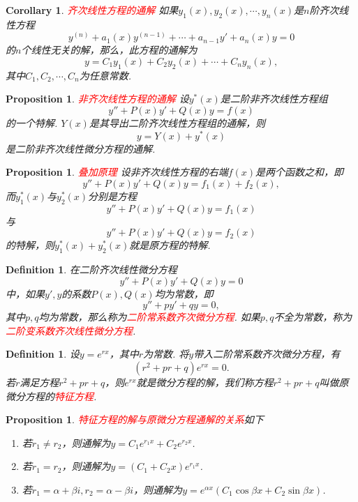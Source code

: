 \documentclass{article}
\newtheorem{corollary}[theorem]{Corollary}
\newtheorem{proposition}[theorem]{Proposition}
\newtheorem{definition}[theorem]{Definition}
\newcommand{\redt}[1]{\textcolor{red}{#1}}
\begin{document}
\begin{corollary}
\rm \redt{齐次线性方程的通解} 如果$y_1(x),y_2(x),\cdots,y_n(x)$是$n$阶齐次线性方程
$$
y^{(n)} + a_1(x)y^{(n-1)} + \cdots + a_{n-1}y' + a_n(x)y = 0
$$
的$n$个线性无关的解，那么，此方程的通解为
$$
y = C_1y_1(x) + C_2y_2(x) + \cdots + C_ny_n(x),
$$
其中$C_1,C_2,\cdots,C_n$为任意常数. 
\end{corollary}

\begin{proposition}
\rm \redt{非齐次线性方程的通解} 设$y^*(x)$是二阶非齐次线性方程组
$$
y'' + P(x)y' + Q(x)y = f(x)
$$
的一个特解. $Y(x)$是其导出二阶齐次线性方程组的通解，则
$$
y = Y(x) + y^*(x)
$$
是二阶非齐次线性微分方程的通解. 
\end{proposition}


\begin{proposition}
\rm \redt{叠加原理} 设非齐次线性方程的右端$f(x)$是两个函数之和，即
$$
y'' + P(x)y' + Q(x)y = f_1(x) + f_2(x),
$$
而$y^*_1(x)$与$y^*_2(x)$分别是方程
$$
y'' + P(x)y' + Q(x)y = f_1(x)
$$
与
$$
y'' + P(x)y' + Q(x)y = f_2(x) 
$$
的特解，则$y^*_1(x)+y^*_2(x)$就是原方程的特解. 
\end{proposition}

\begin{definition}
\rm 在二阶齐次线性微分方程
$$
y'' + P(x)y' + Q(x)y = 0
$$
中，如果$y',y$的系数$P(x),Q(x)$均为常数，即
$$
y'' + py' + qy =0,
$$
其中$p,q$均为常数，那么称为\redt{二阶常系数齐次微分方程}. 如果$p,q$不全为常数，称为\redt{二阶变系数齐次线性微分方程}.   
\end{definition}

\begin{definition}
\rm 设$y=e^{rx}$，其中$r$为常数. 将$y$带入二阶常系数齐次微分方程，有
$$
(r^2+pr+q)e^{rx} = 0.
$$
若$r$满足方程$r^2+pr+q$，则$e^{rx}$就是微分方程的解，我们称方程$r^2+pr+q$叫做原微分方程的\redt{特征方程}.
\end{definition}

\begin{proposition}
\rm \redt{特征方程的解与原微分方程通解的关系}如下
\begin{enumerate}
	\item 若$r_1 \neq r_2$，则通解为$y = C_1e^{r_1x}+C_2e^{r_2x}$.
	\item 若$r_1 = r_2$，则通解为$y = (C_1 + C_2x)e^{r_1x}$.
	\item 若$r_1 = \alpha + \beta i , r_2 = \alpha - \beta i$，则通解为$y = e^{\alpha x}(C_1\cos\beta x + C_2\sin\beta x)$.
\end{enumerate}
\end{proposition}
\end{document}
